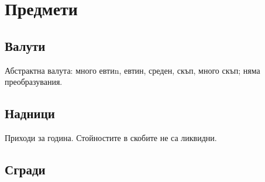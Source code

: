 \chapter{Предмети}
\section{Валути}
Абстрактна валута: много евтиn, евтин, среден, скъп, много скъп; няма преобразувания.  \\

\section{Надници}
Приходи за година. Стойностите в скобите не са ликвидни.

\section{Сгради}

